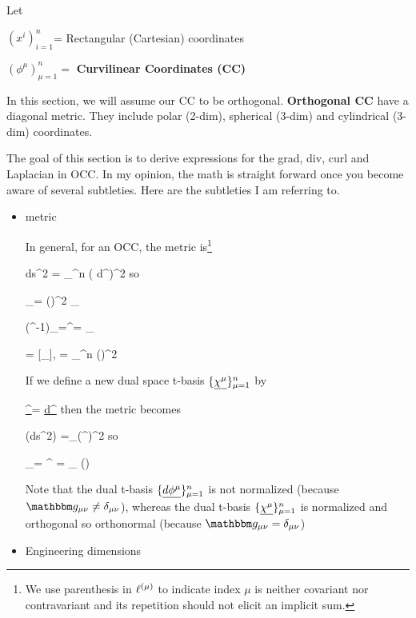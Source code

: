 Let

 $(x^i)_{i=1}^n$= Rectangular (Cartesian) coordinates


$(\phi^\mu)_{\mu=1}^n=$ {\bf Curvilinear Coordinates (CC)}

In this section, we will 
assume our CC to be orthogonal. {\bf Orthogonal CC} have a diagonal metric. 
They  
include polar (2-dim), spherical (3-dim) and cylindrical (3-dim)
coordinates.

The goal of
this section is to
derive expressions for the grad, div, curl and Laplacian in OCC.
In my opinion, the math is straight forward
once you become aware of
several subtleties. Here are
the subtleties I am
referring to.

\begin{itemize}

\item metric

In general, for an OCC, the 
metric is\footnote{We use parenthesis in $\ell^{(\mu)}$ to indicate index $\mu$ 
 is neither covariant nor contravariant
and its repetition should not elicit an implicit sum.}

\beq
ds^2 = \sum_{}^n (\elli{\mu} d\phi^\mu)^2
\eeq
so

\beq
\metric_{\mu\nu}=
(\elli{\mu})^2 \delta_{\mu\nu}
\quad {}
\eeq

\beq
(\metric^{-1})_{\mu\nu}=\metric^{\mu\nu}=
\delta_{\mu\nu}
\eeq


\beq
\metric = [\metric_{\mu\nu}],
\quad
\det \metric = \prod_{}^n
(\elli{\mu})^2
\eeq

If we define
a new dual space t-basis
$\{\ul{\chi^\mu}\}_{\mu=1}^n$ by

\beq
\ul{\chi^\mu}=\elli{\mu} \ul{d\phi^\mu}
\eeq
then the metric becomes



\beq
(ds^2) =\sum_\mu (\chi^\mu)^2
\eeq
so

\beq
\hat{\metric}_{\mu\nu}=
\hat{\metric}^{\mu\nu}
=
\delta_{\mu\nu}
\quad()
\eeq

Note that the dual t-basis
$\{\ul{d\phi^\mu}\}_{\mu=1}^n$ is not normalized (because $\metric_{\mu\nu} \neq\delta_{\mu\nu}$), whereas the
dual t-basis $\{\ul{\chi^\mu}\}_{\mu=1}^n$ is normalized
and orthogonal so orthonormal (because $\metric_{\mu\nu} =\delta_{\mu\nu}$)  

\item Engineering dimensions


\end{itemize}
